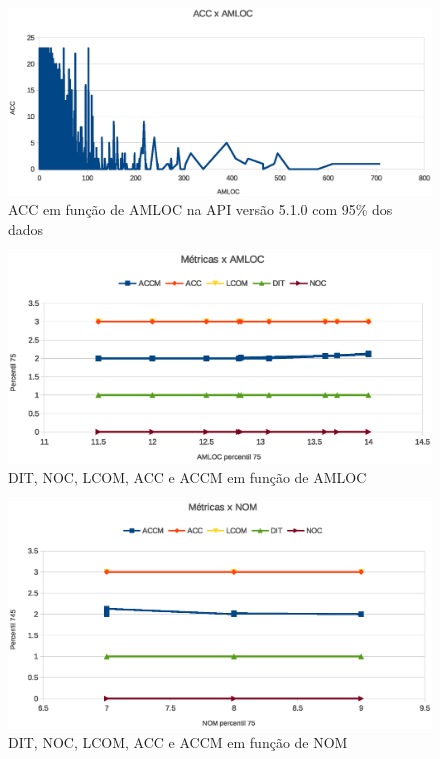 \begin{figure}[!htb]
\centering
\includegraphics [keepaspectratio=true,scale=0.7]{figuras/accxamloc51095.eps}
\caption{ACC em função de AMLOC na API versão 5.1.0 com 95\% dos dados}
\label{fig:accxamloc51095}
\end{figure}

\begin{figure}[!htb]
\centering
\includegraphics [keepaspectratio=true,scale=0.7]{figuras/metricasxamloc.eps}
\caption{DIT, NOC, LCOM, ACC e ACCM em função de AMLOC}
\label{fig:metricasxamloc}
\end{figure}

\begin{figure}[!htb]
\centering
\includegraphics [keepaspectratio=true,scale=0.7]{figuras/metricasxnom.eps}
\caption{DIT, NOC, LCOM, ACC e ACCM em função de NOM}
\label{fig:metricasxnom}
\end{figure}


